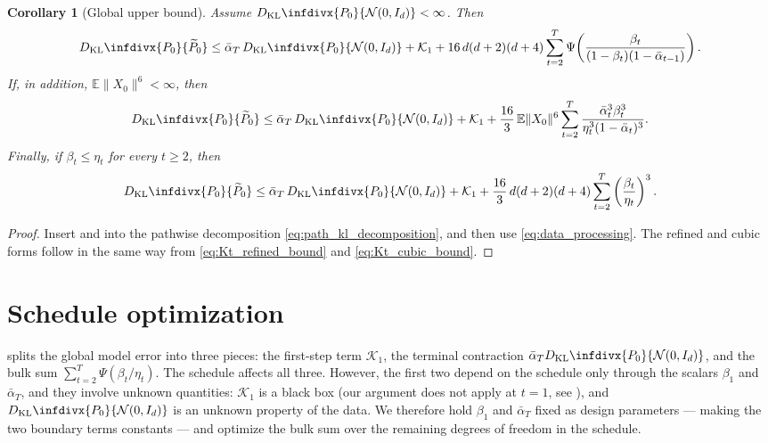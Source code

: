 \documentclass[11pt]{article}
\def\E{\mathbb{E}}
\newcommand{\kl}{D_{\mathrm{KL}}\infdivx}
\newcommand{\norm}[1]{\|#1\|}
\newcommand{\PsiFn}{\Psi}
\newtheorem{corollary}{Corollary}
\begin{document}
\begin{corollary}[Global upper bound]
\label{cor:global_upper_bound}
Assume \(\kl{P_0}{\mathcal N(0,I_d)}<\infty\). Then
\[
\kl{P_0}{\widetilde P_0}
\le
\bar\alpha_T\,\kl{P_0}{\mathcal N(0,I_d)}
+
\mathcal K_1
+
16\,d(d+2)(d+4)
\sum_{t=2}^T \PsiFn\!\left(\frac{\beta_t}{(1-\beta_t)(1-\bar\alpha_{t-1})}\right).
\]
If, in addition, \(\E\norm{X_0}^6<\infty\), then
\[
\kl{P_0}{\widetilde P_0}
\le
\bar\alpha_T\,\kl{P_0}{\mathcal N(0,I_d)}
+
\mathcal K_1
+
\frac{16}{3}\,\E\norm{X_0}^6
\sum_{t=2}^T
\frac{\bar\alpha_t^3\beta_t^3}{\eta_t^3(1-\bar\alpha_t)^3}.
\]
Finally, if \(\beta_t\le \eta_t\) for every \(t\ge 2\), then
\[
\kl{P_0}{\widetilde P_0}
\le
\bar\alpha_T\,\kl{P_0}{\mathcal N(0,I_d)}
+
\mathcal K_1
+
\frac{16}{3}\,d(d+2)(d+4)
\sum_{t=2}^T
\left(\frac{\beta_t}{\eta_t}\right)^3.
\]
\end{corollary}

\begin{proof}
Insert  and  into the pathwise decomposition \eqref{eq:path_kl_decomposition}, and then use \eqref{eq:data_processing}. The refined and cubic forms follow in the same way from \eqref{eq:Kt_refined_bound} and \eqref{eq:Kt_cubic_bound}.
\end{proof}

\section{Schedule optimization}
\label{sec:schedule_implications}

 splits the global model error into three pieces: the first-step term \(\mathcal K_1\), the terminal contraction \(\bar\alpha_T\kl{P_0}{\mathcal N(0,I_d)}\), and the bulk sum \(\sum_{t=2}^T\PsiFn(\beta_t/\eta_t)\). The schedule affects all three. However, the first two depend on the schedule only through the scalars \(\beta_1\) and \(\bar\alpha_T\), and they involve unknown quantities: \(\mathcal K_1\) is a black box (our argument does not apply at \(t=1\), see ), and \(\kl{P_0}{\mathcal N(0,I_d)}\) is an unknown property of the data. We therefore hold \(\beta_1\) and \(\bar\alpha_T\) fixed as design parameters --- making the two boundary terms constants --- and optimize the bulk sum over the remaining degrees of freedom in the schedule.
\end{document}
